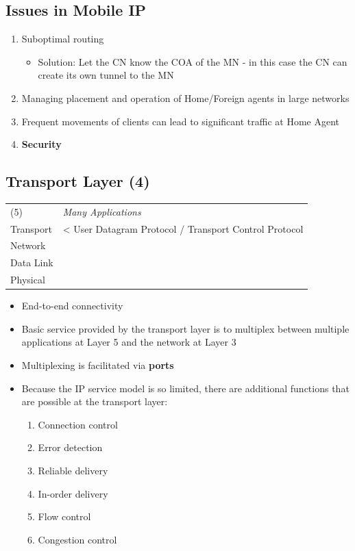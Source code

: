 \documentclass[11pt]{article}
\begin{document}
\subsection{Issues in Mobile IP}
\label{sec:orgheadline118}
\begin{enumerate}
\item Suboptimal routing
\begin{itemize}
\item Solution: Let the CN know the COA of the MN - in this case the CN
can create its own tunnel to the MN
\end{itemize}
\item Managing placement and operation of Home/Foreign agents in large
networks
\item Frequent movements of clients can lead to significant traffic at
Home Agent
\item \textbf{Security}
\end{enumerate}

\subsection{Transport Layer (4)}
\label{sec:orgheadline119}

\begin{center}
\begin{tabular}{ll}
\hline
(5) & \emph{Many Applications}\\
Transport & < User Datagram Protocol / Transport Control Protocol\\
Network & \\
Data Link & \\
Physical & \\
\hline
\end{tabular}
\end{center}

\begin{itemize}
\item End-to-end connectivity
\item Basic service provided by the transport layer is to multiplex
between multiple applications at Layer 5 and the network at Layer 3
\item Multiplexing is facilitated via \textbf{ports}
\item Because the IP service model is so limited, there are additional
functions that are possible at the transport layer:
\begin{enumerate}
\item Connection control
\item Error detection
\item Reliable delivery
\item In-order delivery
\item Flow control
\item Congestion control
\end{enumerate}
\end{itemize}
\end{document}

